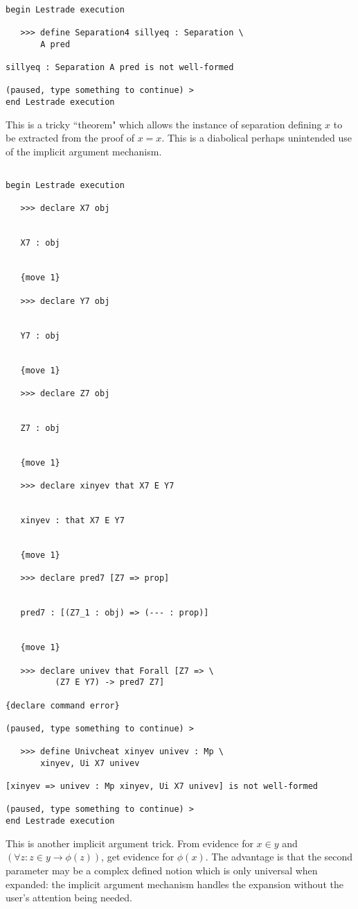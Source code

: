 \documentclass[12pt]{article}
\begin{document}
\begin{verbatim}

begin Lestrade execution

   >>> define Separation4 sillyeq : Separation \
       A pred

sillyeq : Separation A pred is not well-formed

(paused, type something to continue) >
end Lestrade execution
\end{verbatim}

This is a tricky ``theorem" which allows the instance of separation defining $x$ to be extracted from the proof of $x=x$.  This is a diabolical perhaps unintended use of the implicit argument mechanism.

\begin{verbatim}

begin Lestrade execution

   >>> declare X7 obj


   X7 : obj


   {move 1}

   >>> declare Y7 obj


   Y7 : obj


   {move 1}

   >>> declare Z7 obj


   Z7 : obj


   {move 1}

   >>> declare xinyev that X7 E Y7


   xinyev : that X7 E Y7


   {move 1}

   >>> declare pred7 [Z7 => prop]


   pred7 : [(Z7_1 : obj) => (--- : prop)]


   {move 1}

   >>> declare univev that Forall [Z7 => \
          (Z7 E Y7) -> pred7 Z7]

{declare command error}

(paused, type something to continue) >

   >>> define Univcheat xinyev univev : Mp \
       xinyev, Ui X7 univev

[xinyev => univev : Mp xinyev, Ui X7 univev] is not well-formed

(paused, type something to continue) >
end Lestrade execution
\end{verbatim}

This is another implicit argument trick.  From evidence for $x \in y$ and $(\forall z: z \in y \rightarrow \phi(z))$, get evidence for $\phi(x)$.  The advantage is
that the second parameter may be a complex defined notion which is only universal when expanded:  the implicit argument mechanism handles the expansion without the user's attention being needed.
\end{document}
